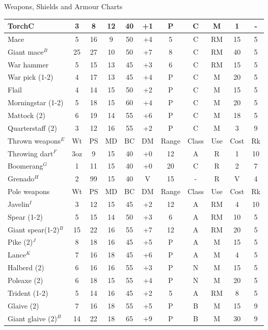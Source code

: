 \begin{Tables}{Weapons, Shields and Armour Charts}
\begin{tabularx}{\linewidth}{Xcccccccccc}
TorchC			& 3	& 8	& 12	& 40	& +1	& P	& C	& M	& 1	& -	\\ \hline
Mace			& 5	& 16	& 9	& 50	& +4	& 5	& C	& RM	& 15	& 5	\\ \hline
Giant mace$^B$		& 25	& 27	& 10	& 50	& +7	& 8	& C	& RM	& 40	& 5	\\ \hline
War hammer		& 5	& 15	& 13	& 45	& +3	& 6	& C	& RM	& 15	& 5	\\ \hline
War pick (1-2)		& 4	& 17	& 13	& 45	& +4	& P	& C	& M	& 20	& 5	\\ \hline
Flail			& 4	& 14	& 15	& 50	& +2	& P	& C	& M	& 15	& 5	\\ \hline
Morningstar (1-2)	& 5	& 18	& 15	& 60	& +4	& P	& C	& M	& 20	& 5	\\ \hline
Mattock (2)		& 6	& 19	& 14	& 55	& +6	& P	& C	& M	& 18	& 5	\\ \hline
Quarterstaff (2)	& 3	& 12	& 16	& 55	& +2	& P	& C	& M	& 3	& 9	\\ \hline
Thrown weapons$^E$		& Wt	& PS	& MD	& BC	& DM	& Range	& Class	& Use	& Cost	& Rk	\\ \midrule
Throwing dart$^F$	& 3oz	& 9	& 15	& 40	& +0	& 12	& A	& R	& 1	& 10	\\ \hline
Boomerang$^G$		& 1	& 11	& 15	& 40	& +0	& 20	& C	& R	& 2	& 7	\\ \hline
Grenado$^H$		& 2	& 99	& 15	& 40	& V	& 15	& -	& R	& V	& 4	\\ \hline
Pole weapons		& Wt	& PS	& MD	& BC	& DM	& Range	& Class	& Use	& Cost	& Rk	\\ \midrule
Javelin$^I$		& 3	& 12	& 15	& 45	& +2	& 12	& A	& RM	& 4	& 10	\\ \hline
Spear (1-2)		& 5	& 15	& 14	& 50	& +3	& 6	& A	& RM	& 10	& 5	\\ \hline
Giant spear(1-2)$^B$	& 15	& 22	& 16	& 55	& +7	& 12	& A	& RM	& 20	& 5	\\ \hline
Pike (2)$^J$		& 8	& 18	& 16	& 45	& +5	& P	& A	& M	& 15	& 5	\\ \hline
Lance$^K$		& 7	& 16	& 18	& 45	& +6	& P	& A	& M	& 4	& 5	\\ \hline
Halberd (2)		& 6	& 16	& 16	& 55	& +3	& P	& N	& M	& 15	& 5	\\ \hline
Poleaxe (2)		& 6	& 18	& 15	& 55	& +4	& P	& N	& M	& 20	& 5	\\ \hline
Trident (1-2)		& 5	& 14	& 16	& 45	& +2	& 5	& A	& RM	& 8	& 5	\\ \hline
Glaive (2)		& 7	& 16	& 18	& 55	& +5	& P	& B	& M	& 15	& 9	\\ \hline
Giant glaive (2)$^B$	& 14	& 22	& 18	& 65	& +9	& P	& B	& M	& 30	& 9	\\ \hline

\end{tabularx}
\end{Tables}
